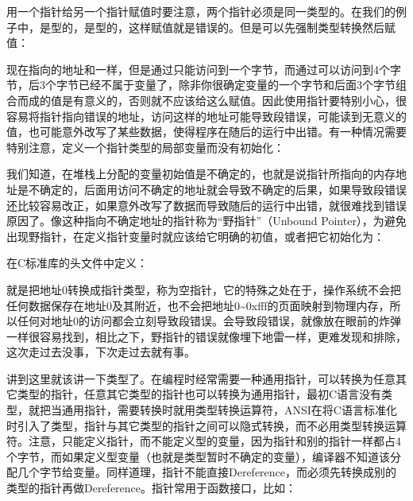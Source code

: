 用一个指针给另一个指针赋值时要注意，两个指针必须是同一类型的。在我们的例子中，是型的，是型的，这样赋值就是错误的。但是可以先强制类型转换然后赋值：





现在指向的地址和一样，但是通过只能访问到一个字节，而通过可以访问到4个字节，后3个字节已经不属于变量了，除非你很确定变量的一个字节和后面3个字节组合而成的值是有意义的，否则就不应该给这么赋值。因此使用指针要特别小心，很容易将指针指向错误的地址，访问这样的地址可能导致段错误，可能读到无意义的值，也可能意外改写了某些数据，使得程序在随后的运行中出错。有一种情况需要特别注意，定义一个指针类型的局部变量而没有初始化：




我们知道，在堆栈上分配的变量初始值是不确定的，也就是说指针所指向的内存地址是不确定的，后面用访问不确定的地址就会导致不确定的后果，如果导致段错误还比较容易改正，如果意外改写了数据而导致随后的运行中出错，就很难找到错误原因了。像这种指向不确定地址的指针称为“野指针”（Unbound Pointer），为避免出现野指针，在定义指针变量时就应该给它明确的初值，或者把它初始化为：




在C标准库的头文件中定义：




就是把地址0转换成指针类型，称为空指针，它的特殊之处在于，操作系统不会把任何数据保存在地址0及其附近，也不会把地址0\textasciitilde{}\BookSplit{}0xfff的页面映射到物理内存，所以任何对地址0的访问都会立刻导致段错误。会导致段错误，就像放在眼前的炸弹一样很容易找到，相比之下，野指针的错误就像埋下地雷一样，更难发现和排除，这次走过去没事，下次走过去就有事。



讲到这里就该讲一下类型了。在编程时经常需要一种通用指针，可以转换为任意其它类型的指针，任意其它类型的指针也可以转换为通用指针，最初C语言没有类型，就把当通用指针，需要转换时就用类型转换运算符\BookCode{(\BookSplit{})\BookSplit{}}，ANSI在将C语言标准化时引入了类型，指针与其它类型的指针之间可以隐式转换，而不必用类型转换运算符。注意，只能定义指针，而不能定义型的变量，因为指针和别的指针一样都占4个字节，而如果定义型变量（也就是类型暂时不确定的变量），编译器不知道该分配几个字节给变量。同样道理，指针不能直接Dereference，而必须先转换成别的类型的指针再做Dereference。指针常用于函数接口，比如：


